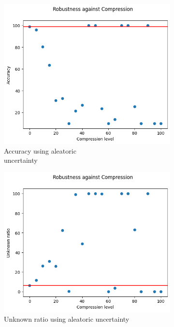 \begin{figure}[h]
	\centering
	\begin{subfigure}{.33\textwidth}
		\centering
		\includegraphics[width=0.9\linewidth]{ImageFiles/EvalBNN/CO/AU/acc}
		\caption{Accuracy using aleatoric \\ uncertainty}
		\label{fig:co_au_acc}
	\end{subfigure}%
	\begin{subfigure}{.33\textwidth}
		\centering
		\includegraphics[width=0.9\linewidth]{ImageFiles/EvalBNN/CO/AU/unkn}
		\caption{Unknown ratio using aleatoric uncertainty}
		\label{fig:co_au_unkn}
	\end{subfigure}%
	\begin{subfigure}{.33\textwidth}

\end{subfigure}
\end{figure}
